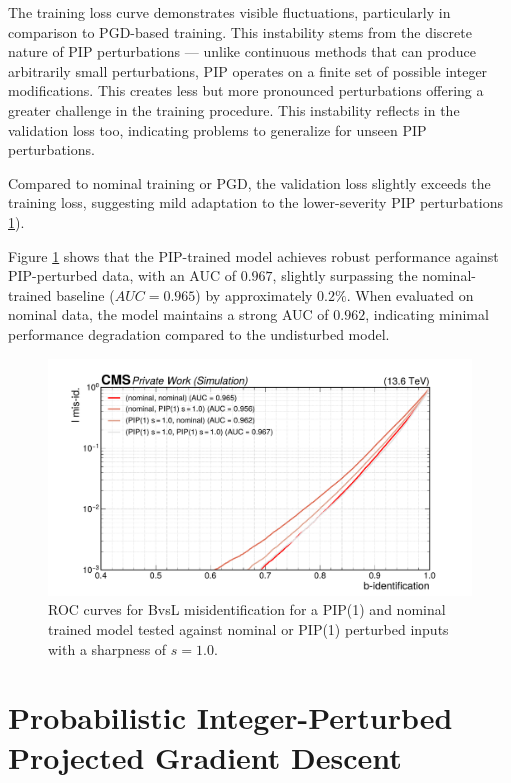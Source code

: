 The training loss curve demonstrates visible fluctuations, particularly in comparison to PGD-based training. This instability stems from the discrete nature of PIP perturbations — unlike continuous methods that can produce arbitrarily small perturbations, PIP operates on a finite set of possible integer modifications. This creates less but more pronounced perturbations offering a greater challenge in the training procedure. This instability reflects in the validation loss too, indicating problems to generalize for unseen PIP perturbations. 

Compared to nominal training or PGD, the validation loss slightly exceeds the training loss, suggesting mild adaptation to the lower-severity PIP perturbations \ref{fig:intprob_rocs_training}).

Figure \ref{fig:intprob_rocs_training} shows that the PIP-trained model achieves robust performance against PIP-perturbed data, with an AUC of $0.967$, slightly surpassing the nominal-trained baseline ($AUC = 0.965$) by approximately $0.2\%$. When evaluated on nominal data, the model maintains a strong AUC of $0.962$, indicating minimal performance degradation compared to the undisturbed model.

\begin{figure}[h]
\centering
    \includegraphics[width=15cm]{media/output/roc_bvsl_intprob_permutations.pdf}
    \caption{ROC curves for BvsL misidentification for a PIP(1) and nominal trained model tested against nominal or PIP(1) perturbed inputs with a sharpness of $s=1.0$.}
    \label{fig:intprob_rocs_training}
\end{figure}

\FloatBarrier
\section{Probabilistic Integer-Perturbed Projected Gradient Descent}


